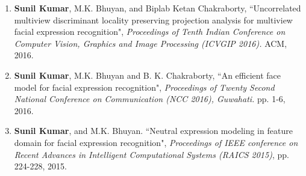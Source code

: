 \begin{enumerate}
	
	\item {\label{ICVGIP2016}} {\bf Sunil Kumar}, M.K. Bhuyan, and Biplab Ketan Chakraborty, ``Uncorrelated multiview discriminant locality preserving projection analysis for multiview facial expression recognition", \emph{Proceedings of Tenth Indian Conference on Computer Vision, Graphics and Image Processing (ICVGIP 2016).} ACM, 2016.
	
	\item {\label{NCC2016}} {\bf Sunil Kumar}, M.K. Bhuyan and B. K. Chakraborty, ``An efficient face model for facial expression recognition", \emph{Proceedings of Twenty Second National Conference on Communication (NCC 2016), Guwahati.} pp. 1-6, 2016.
	
	\item {\label{RAICS2015}} {\bf Sunil Kumar}, and M.K. Bhuyan. ``Neutral expression modeling in feature domain for facial expression recognition", \emph{Proceedings of IEEE conference on Recent Advances in Intelligent Computational Systems (RAICS 2015)}, pp. 224-228, 2015.
	
\end{enumerate}

